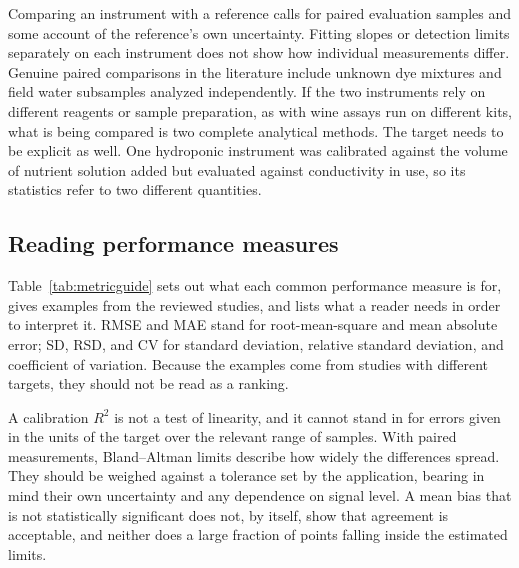 Comparing an instrument with a reference calls for paired evaluation samples and some account of the reference's own uncertainty.\citep{bland1986statistical} Fitting slopes or detection limits separately on each instrument does not show how individual measurements differ.\citep{wittbrodt2015open,grasse2015teaching,bruininks2022inexpensive} Genuine paired comparisons in the literature include unknown dye mixtures\citep{clippard2016construction} and field water subsamples analyzed independently.\citep{bulusu2024technical} If the two instruments rely on different reagents or sample preparation, as with wine assays run on different kits, what is being compared is two complete analytical methods.\citep{tonelli2025portable} The target needs to be explicit as well. One hydroponic instrument was calibrated against the volume of nutrient solution added but evaluated against conductivity in use, so its statistics refer to two different quantities.\citep{stevens2024low}

\subsection{Reading performance measures}

Table~\ref{tab:metricguide} sets out what each common performance measure is for, gives examples from the reviewed studies, and lists what a reader needs in order to interpret it. RMSE and MAE stand for root-mean-square and mean absolute error; SD, RSD, and CV for standard deviation, relative standard deviation, and coefficient of variation. Because the examples come from studies with different targets, they should not be read as a ranking.

A calibration $R^2$ is not a test of linearity,\citep{prairie2020accurate} and it cannot stand in for errors given in the units of the target over the relevant range of samples.\citep{cirrone2026analytical} With paired measurements, Bland--Altman limits describe how widely the differences spread. They should be weighed against a tolerance set by the application, bearing in mind their own uncertainty and any dependence on signal level. A mean bias that is not statistically significant does not, by itself, show that agreement is acceptable, and neither does a large fraction of points falling inside the estimated limits.\citep{bland1986statistical}

